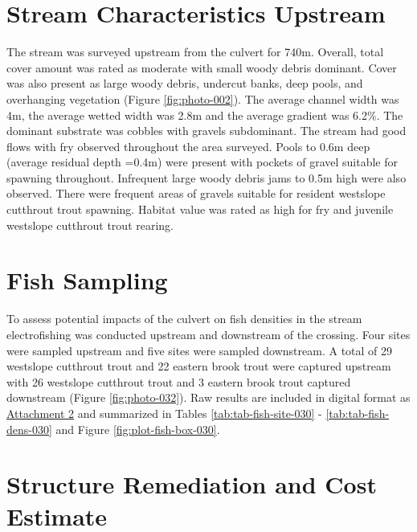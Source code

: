 \documentclass[
]{book}
\begin{document}
\hypertarget{stream-characteristics-upstream-2}{%
\section*{Stream Characteristics Upstream}\label{stream-characteristics-upstream-2}}

The stream was surveyed upstream from the culvert for 740m. Overall, total cover amount was rated as moderate with small woody debris dominant. Cover was also present as large woody debris, undercut banks, deep pools, and overhanging vegetation (Figure \ref{fig:photo-002}). The average channel width was 4m, the average wetted width was 2.8m and the average gradient was 6.2\%. The dominant substrate was cobbles with gravels subdominant. The stream had good flows with fry observed throughout the area surveyed. Pools to 0.6m deep (average residual depth =0.4m) were present with pockets of gravel suitable for spawning throughout. Infrequent large woody debris jams to 0.5m high were also observed. There were frequent areas of gravels suitable for resident westslope cutthrout trout spawning. Habitat value was rated as high for fry and juvenile westslope cutthrout trout rearing.

\hypertarget{fish-sampling-1}{%
\section*{Fish Sampling}\label{fish-sampling-1}}

To assess potential impacts of the culvert on fish densities in the stream electrofishing was conducted upstream and downstream of the crossing. Four sites were sampled upstream and five sites were sampled downstream. A total of 29 westslope cutthrout trout and 22 eastern brook trout were captured upstream with 26 westslope cutthrout trout and 3 eastern brook trout captured downstream (Figure \ref{fig:photo-032}). Raw results are included in digital format as \href{https://github.com/NewGraphEnvironment/fish_passage_elk_2020_reporting/raw/master/data/habitat_confirmations.xls}{Attachment 2} and summarized in Tables \ref{tab:tab-fish-site-030} - \ref{tab:tab-fish-dens-030} and Figure \ref{fig:plot-fish-box-030}.

\hypertarget{structure-remediation-and-cost-estimate-2}{%
\section*{Structure Remediation and Cost Estimate}\label{structure-remediation-and-cost-estimate-2}}
\end{document}
